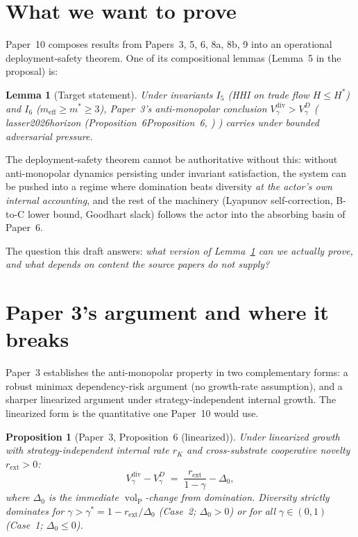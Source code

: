 \documentclass{article}
\makeatletter
\newcommand{\citep}[2][]{%
  \begingroup
  \def\@tmpkey{#2}%
  \ifx\@tmpkey\@empty\else
    (\ifx\@empty#1\@empty\else #1, \fi
     \@nameuse{bibkey@\@tmpkey})%
  \fi
  \endgroup
}
\newtheorem{proposition}{Proposition}
\newtheorem{lemma}{Lemma}
\DeclareMathOperator{\vol}{vol}
\newcommand{\volL}{{\vol_{\mathrm{P}}}}
\newcommand{\rext}{r_{\mathrm{ext}}}
\newcommand{\meff}{m_{\mathrm{eff}}}
\newcommand{\Vdisc}{V_{\gamma}}
\makeatother
\begin{document}
\section{What we want to prove}

Paper~10 composes results from Papers~3, 5, 6, 8a, 8b, 9 into an
operational deployment-safety theorem.  One of its compositional lemmas
(Lemma~5 in the proposal) is:

\begin{lemma}[Target statement]
\label{lem:target}
Under invariants $I_5$ (HHI on trade flow $H \leq H^*$) and $I_6$
($\meff \geq m^* \geq 3$), Paper~3's anti-monopolar conclusion
$\Vdisc^{\mathrm{div}} > \Vdisc^{D}$ (\citep[Proposition~6]{lasser2026horizon})
carries under bounded adversarial pressure.
\end{lemma}

The deployment-safety theorem cannot be authoritative without this:
without anti-monopolar dynamics persisting under invariant satisfaction,
the system can be pushed into a regime where domination beats diversity
\emph{at the actor's own internal accounting}, and the rest of the
machinery (Lyapunov self-correction, B-to-C lower bound, Goodhart slack)
follows the actor into the absorbing basin of Paper~6.

The question this draft answers: \emph{what version of
Lemma~\ref{lem:target} can we actually prove, and what depends on
content the source papers do not supply?}

\section{Paper 3's argument and where it breaks}

Paper~3 establishes the anti-monopolar property in two complementary
forms: a robust minimax dependency-risk argument (no growth-rate
assumption), and a sharper linearized argument under
strategy-independent internal growth.  The linearized form is the
quantitative one Paper~10 would use.

\begin{proposition}[Paper~3, Proposition~6 (linearized)]
\label{prop:p3_anti_monopolar}
Under linearized growth with strategy-independent internal rate $r_K$
and cross-substrate cooperative novelty $\rext > 0$:
\begin{equation}
\label{eq:p3_diff}
\Vdisc^{\mathrm{div}} - \Vdisc^{D} \;=\; \frac{\rext}{1 - \gamma}
  - \Delta_0,
\end{equation}
where $\Delta_0$ is the immediate $\volL$-change from domination.
Diversity strictly dominates for $\gamma > \gamma^* = 1 -
\rext/\Delta_0$ (Case~2; $\Delta_0 > 0$) or for all $\gamma \in (0, 1)$
(Case~1; $\Delta_0 \leq 0$).
\end{proposition}
\end{document}

